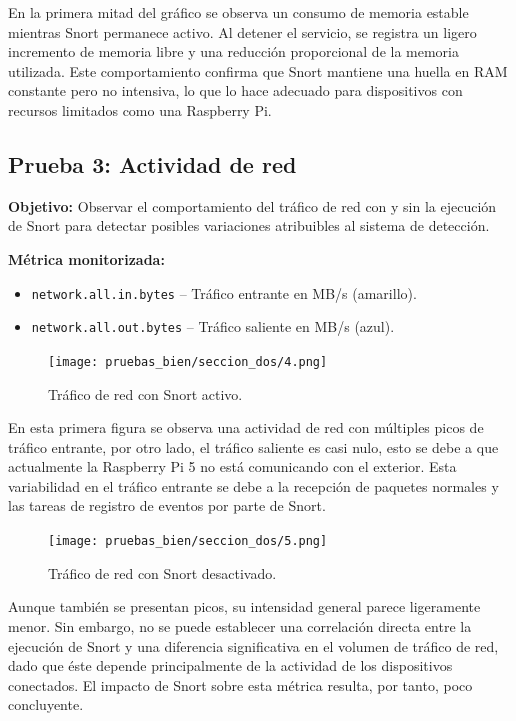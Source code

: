 \documentclass[11pt,a4paper,twoside]{report}
\begin{document}
En la primera mitad del gráfico se observa un consumo de memoria estable mientras Snort permanece activo. Al detener el servicio, se registra un ligero incremento de memoria libre y una reducción proporcional de la memoria utilizada. Este comportamiento confirma que Snort mantiene una huella en RAM constante pero no intensiva, lo que lo hace adecuado para dispositivos con recursos limitados como una Raspberry Pi.

\subsection*{Prueba 3: Actividad de red}

\textbf{Objetivo:}
Observar el comportamiento del tráfico de red con y sin la ejecución de Snort para detectar posibles variaciones atribuibles al sistema de detección.

\textbf{Métrica monitorizada:} \begin{itemize} \item \texttt{network.all.in.bytes} – Tráfico entrante en MB/s (amarillo). \item \texttt{network.all.out.bytes} – Tráfico saliente en MB/s (azul). \end{itemize}

\begin{figure}[H] \centering \texttt{[image: pruebas\_bien/seccion\_dos/4.png]} \caption{Tráfico de red con Snort activo.} \end{figure}

En esta primera figura se observa una actividad de red con múltiples picos de tráfico entrante, por otro lado, el tráfico saliente es casi nulo, esto se debe a que actualmente la Raspberry Pi 5 no está comunicando con el exterior. Esta variabilidad en el tráfico entrante se debe a la recepción de paquetes normales y las tareas de registro de eventos por parte de Snort.

\begin{figure}[H] \centering \texttt{[image: pruebas\_bien/seccion\_dos/5.png]} \caption{Tráfico de red con Snort desactivado.} \end{figure}

Aunque también se presentan picos, su intensidad general parece ligeramente menor. Sin embargo, no se puede establecer una correlación directa entre la ejecución de Snort y una diferencia significativa en el volumen de tráfico de red, dado que éste depende principalmente de la actividad de los dispositivos conectados. El impacto de Snort sobre esta métrica resulta, por tanto, poco concluyente.
\end{document}
